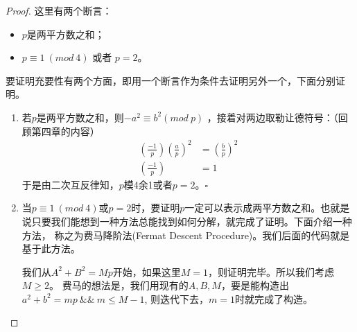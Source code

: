 \begin{proof}
这里有两个断言：
\begin{itemize}
	\item $p$是两平方数之和；
	\item $p\equiv 1\ (mod\ 4)$ 或者 $p=2$。
\end{itemize}

要证明充要性有两个方面，即用一个断言作为条件去证明另外一个，下面分别证明。
\begin{enumerate}
	\item 若$p$是两平方数之和，则$-a^2\equiv b^2 (mod \ p)$ ，接着对两边取勒让德符号：（回顾第四章的内容）
	\begin{align*}
	\left(\frac{-1}{p}\right)\left(\frac{a}{p}\right)^2&=\left(\frac{b}{p}\right)^2 \\
	\left(\frac{-1}{p}\right)&=1
	\end{align*}
	于是由二次互反律知，$p$模4余1或者$p=2$。$\square$
	\item 当$p\equiv 1\ (mod\ 4)$或$p=2$时，要证明$p$一定可以表示成两平方数之和。也就是说只要我们能想到一种方法总能找到如何分解，就完成了证明。下面介绍一种方法，
	称之为{\heiti 费马降阶法(Fermat Descent Procedure)}。我们后面的代码就是基于此方法。
	
	我们从$A^2+B^2=Mp$开始，如果这里$M=1$，则证明完毕。所以我们考虑$M\ge 2$。
	费马的想法是，我们用现有的$A,B,M$，要是能构造出$a^2+b^2=mp \ \&\&\ m\le M-1$,
	则迭代下去，$m=1$时就完成了构造。


\end{enumerate}
\end{proof}
